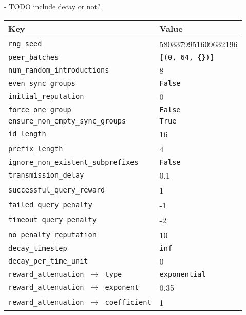 - TODO include decay or not?
\begin{longtable}{|l|l|}
\hline
\rowcolor{slightgray} \T Key & Value \B\\
\hline
\cellcolor{slightgray}\T \texttt{rng\_seed} & 5803379951609632196 \B\\
\hline
\cellcolor{slightgray}\T \texttt{peer\_batches} & \texttt{[(0, 64, \{\})]} \B\\
\hline
\cellcolor{slightgray}\T \texttt{num\_random\_introductions} & 8 \B\\
\hline
\cellcolor{slightgray}\T \texttt{even\_sync\_groups} & \texttt{False} \B\\
\hline
\cellcolor{slightgray}\T \texttt{initial\_reputation} & 0 \B\\
\hline
\cellcolor{slightgray}\T \texttt{force\_one\_group} & \texttt{False} \B\\
\hline
\cellcolor{slightgray}\T \texttt{ensure\_non\_empty\_sync\_groups} & \texttt{True} \B\\
\hline
\cellcolor{slightgray}\T \texttt{id\_length} & 16 \B\\
\hline
\cellcolor{slightgray}\T \texttt{prefix\_length} & 4 \B\\
\hline
\cellcolor{slightgray}\T \texttt{ignore\_non\_existent\_subprefixes} & \texttt{False} \B\\
\hline
\cellcolor{slightgray}\T \texttt{transmission\_delay} & 0.1 \B\\
\hline
\cellcolor{slightgray}\T \texttt{successful\_query\_reward} & 1 \B\\
\hline
\cellcolor{slightgray}\T \texttt{failed\_query\_penalty} & -1 \B\\
\hline
\cellcolor{slightgray}\T \texttt{timeout\_query\_penalty} & -2 \B\\
\hline
\cellcolor{slightgray}\T \texttt{no\_penalty\_reputation} & 10 \B\\
\hline
\cellcolor{slightgray}\T \texttt{decay\_timestep} & \texttt{inf} \B\\%
\hline
\cellcolor{slightgray}\T \texttt{decay\_per\_time\_unit} & 0 \B\\%
\hline
\cellcolor{slightgray}\T \texttt{reward\_attenuation $\rightarrow$ type} & \texttt{exponential} \B\\
\hline
\cellcolor{slightgray}\T \texttt{reward\_attenuation $\rightarrow$ exponent} & 0.35 \B\\
\hline
\cellcolor{slightgray}\T \texttt{reward\_attenuation $\rightarrow$ coefficient} & 1 \B\\

\end{longtable}

